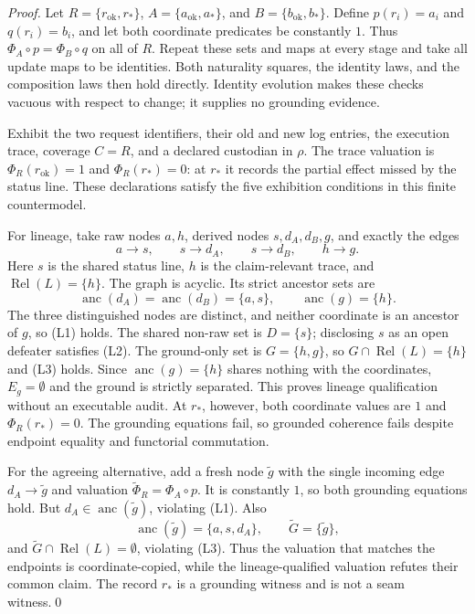 \documentclass[twocolumn,envcountsect,envcountsame,natbib]{svjour3}
\begin{document}
\begin{proof}
Let $R=\{r_{\mathrm{ok}},r_*\}$, $A=\{a_{\mathrm{ok}},a_*\}$, and $B=\{b_{\mathrm{ok}},b_*\}$. Define $p(r_i)=a_i$ and $q(r_i)=b_i$, and let both coordinate predicates be constantly $1$. Thus $\Phi_A\circ p=\Phi_B\circ q$ on all of $R$. Repeat these sets and maps at every stage and take all update maps to be identities. Both naturality squares, the identity laws, and the composition laws then hold directly. Identity evolution makes these checks vacuous with respect to change; it supplies no grounding evidence.

Exhibit the two request identifiers, their old and new log entries, the execution trace, coverage $C=R$, and a declared custodian in $\rho$. The trace valuation is $\Phi_R(r_{\mathrm{ok}})=1$ and $\Phi_R(r_*)=0$: at $r_*$ it records the partial effect missed by the status line. These declarations satisfy the five exhibition conditions in this finite countermodel.

For lineage, take raw nodes $a,h$, derived nodes $s,d_A,d_B,g$, and exactly the edges
\[
a\to s,\qquad s\to d_A,\qquad s\to d_B,\qquad h\to g.
\]
Here $s$ is the shared status line, $h$ is the claim-relevant trace, and $\operatorname{Rel}(L)=\{h\}$. The graph is acyclic. Its strict ancestor sets are
\[
\operatorname{anc}(d_A)=\operatorname{anc}(d_B)=\{a,s\},
\qquad \operatorname{anc}(g)=\{h\}.
\]
The three distinguished nodes are distinct, and neither coordinate is an ancestor of $g$, so (L1) holds. The shared non-raw set is $D=\{s\}$; disclosing $s$ as an open defeater satisfies (L2). The ground-only set is $G=\{h,g\}$, so $G\cap\operatorname{Rel}(L)=\{h\}$ and (L3) holds. Since $\operatorname{anc}(g)=\{h\}$ shares nothing with the coordinates, $E_g=\emptyset$ and the ground is strictly separated. This proves lineage qualification without an executable audit. At $r_*$, however, both coordinate values are $1$ and $\Phi_R(r_*)=0$. The grounding equations fail, so grounded coherence fails despite endpoint equality and functorial commutation.

For the agreeing alternative, add a fresh node $\widetilde g$ with the single incoming edge $d_A\to\widetilde g$ and valuation $\widetilde\Phi_R=\Phi_A\circ p$. It is constantly $1$, so both grounding equations hold. But $d_A\in\operatorname{anc}(\widetilde g)$, violating (L1). Also
\[
\operatorname{anc}(\widetilde g)=\{a,s,d_A\},
\qquad \widetilde G=\{\widetilde g\},
\]
and $\widetilde G\cap\operatorname{Rel}(L)=\emptyset$, violating (L3). Thus the valuation that matches the endpoints is coordinate-copied, while the lineage-qualified valuation refutes their common claim. The record $r_*$ is a grounding witness and is not a seam witness.\qed
\end{proof}
\end{document}
